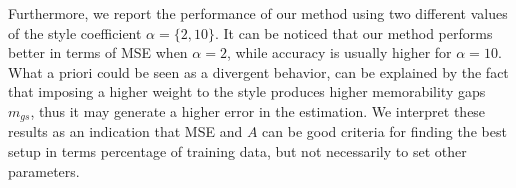 \documentclass{sig-alternate-05-2015}
\begin{document}

Furthermore, we report the performance of our method using two different values of the style coefficient $\alpha=\{2,10\}$. It can be noticed that 
our method performs better in terms of MSE when $\alpha=2$, while accuracy is usually higher for $\alpha=10$. What a priori could be 
seen as a divergent behavior, can be explained by the fact that imposing a higher weight to the style produces higher memorability gaps $m_{gs}$, 
thus it may generate a higher error in the estimation. %
We interpret these  results as an indication that MSE and $A$ can be good criteria for finding the best setup in terms percentage of training data, but not necessarily to 
set other parameters.%
\end{document}
